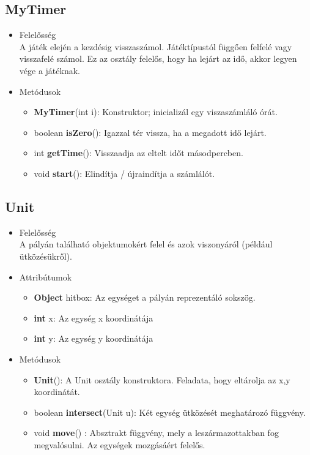 \begin{itemize}
\begin{itemize}
	\end{itemize}
\end{itemize}

\subsection{MyTimer}
\begin{itemize}
\item Felelősség\\
A játék elején a kezdésig visszaszámol. Játéktípustól függően felfelé vagy visszafelé számol. Ez az osztály felelős, hogy ha lejárt az idő, akkor legyen vége a játéknak.
\item Metódusok
	\begin{itemize}
		\item \textbf{MyTimer}(int i): Konstruktor; inicializál egy viszaszámláló órát.
		\item boolean \textbf{isZero}(): Igazzal tér vissza, ha a megadott idő lejárt.
		\item int \textbf{getTime}(): Visszaadja az eltelt időt másodpercben.
		\item void \textbf{start}(): Elindítja / újraindítja a számlálót.
	\end{itemize}
\end{itemize}

\subsection{Unit}
\begin{itemize}
\item Felelősség\\
A pályán található objektumokért felel és azok viszonyáról (például ütközésükről).
\item Attribútumok
	\begin{itemize}
		\item \textbf{Object} hitbox: Az egységet a pályán reprezentáló sokszög.
		\item \textbf{int} x: Az egység x koordinátája
		\item \textbf{int} y: Az egység y koordinátája
	\end{itemize}
\item Metódusok
	\begin{itemize}
	    \item \textbf{Unit}(): A Unit osztály konstruktora. Feladata, hogy eltárolja az x,y koordinátát.
		\item boolean \textbf{intersect}(Unit u): Két egység ütközését meghatározó függvény.
		\item void \textbf{move}() : Absztrakt függvény, mely a leszármazottakban fog megvalósulni. Az egységek mozgásáért felelős.
	\end{itemize}
\end{itemize}

